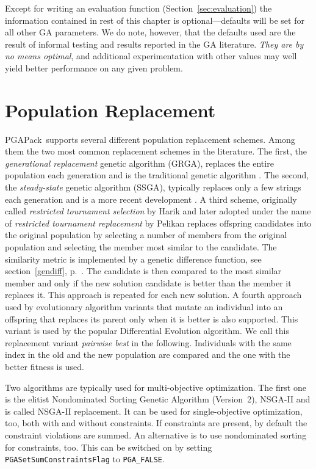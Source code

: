 \documentclass{report}
\newcommand{\pga}{PGAPack}
\begin{document}
Except for writing an evaluation function (Section~\ref{sec:evaluation}) the
information contained in rest of this chapter is optional---defaults will be
set for all other GA parameters.  We do note, however, that the defaults used
are the result of informal testing and results reported in the GA literature.
{\em They are by no means optimal}, and additional experimentation
with other values may well yield better performance on any given problem.


\section{Population Replacement}\label{sec:population-replacement}
\pga\ supports several different population replacement schemes.
Among them the two most common replacement schemes in the literature.
The first,
the {\em generational replacement} genetic algorithm (GRGA), replaces the
entire population each generation and is the traditional genetic algorithm
\cite{Ho92}.  The second, the {\em steady-state} genetic algorithm (SSGA),
typically replaces only a few strings each generation and is a more recent
development
\cite{Sy89,Wh89,WhKa88}.
A third scheme, originally called \textit{restricted tournament
selection} by Harik \cite{Har94,Har95} and later adopted under the name of
\textit{restricted tournament replacement} by Pelikan \cite{Pel05}
replaces offspring candidates into the original population by selecting
a number of members from the original population and selecting the
member most similar to the candidate. The similarity metric is
implemented by a genetic difference function, see
section~\ref{gendiff}, p.~\pageref{gendiff}.
The candidate is then compared to the most similar member and only if
the new solution candidate is better than the member it replaces it.
This approach is repeated for each new solution.
A fourth approach used by evolutionary algorithm variants that mutate an
individual into an offspring that replaces its parent only when it is
better is also supported. This variant is used by the popular
Differential Evolution \cite{SP95,SP97,PSL05} algorithm.
We call this replacement variant
\textit{pairwise best} in the following. Individuals with the same index
in the old and the new population are compared and the one with the
better fitness is used.

Two algorithms are typically used for multi-objective optimization.
The first one is
the elitist Nondominated Sorting Genetic Algorithm (Version~2), NSGA-II
\cite{DPAM02} and is called NSGA-II replacement. It can be used for
single-objective optimization, too, both with and without constraints.
If constraints are present, by default the constraint violations are
summed. An alternative is to use nondominated sorting for
constraints, too.  This can be switched on by setting
\verb+PGASetSumConstraintsFlag+ to \verb+PGA_FALSE+.
\end{document}
